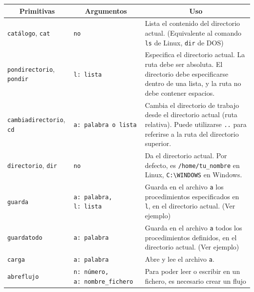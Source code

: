 \begin{center} \begin{longtable}{|m{3cm}|m{32mm}|m{9cm}|} \hline 
   \multicolumn{1}{|c|}{\textbf{Primitivas}} &
      \multicolumn{1}{c|}{\textbf{Argumentos}} &
         \multicolumn{1}{c|}{\textbf{Uso}} \\ \endhead \hline 
   \texttt{cat\'alogo}, \index{cat\'alogo@\texttt{cat\'alogo}}
     \texttt{cat} \index{cat@\texttt{cat}} & \texttt{no} &
        Lista el contenido del directorio actual. (Equivalente al comando
        \texttt{ls} de Linux, \texttt{dir} de DOS) \\ \hline 
   \texttt{pondirectorio}, \index{pondirectorio@\texttt{pondirectorio}}
     \texttt{pondir} \index{pondir@\texttt{pondir}} & \texttt{l: lista} &
        Especifica el directorio actual. La ruta debe ser absoluta. El
        directorio debe especificarse dentro de una lista, y la ruta no
        debe contener espacios. \\ \hline 
   \texttt{cambiadirectorio},
     \index{cambiadirectorio@\texttt{cambiadirectorio}}
     \texttt{cd} \index{cd@\texttt{cd}} & \texttt{a: palabra o lista} &
        Cambia el directorio de trabajo desde el directorio actual (ruta
        relativa). Puede utilizarse \texttt{..} para referirse a la
        ruta del directorio superior. \\ \hline 
   \texttt{directorio}, \index{directorio@\texttt{directorio}}
      \texttt{dir} \index{dir@\texttt{dir}} & \texttt{no} &
        Da el directorio actual. Por defecto, es \texttt{/home/tu\_nombre}
        en Linux, \texttt{C:\textbackslash{}WINDOWS} en Windows. \\ \hline 
   \texttt{guarda} \index{guarda@\texttt{guarda}} & 
      \texttt{a:~palabra, l:~lista} & 
        Guarda en el archivo \texttt{a} los procedimientos especificados en
        \texttt{l}, en el directorio actual. (Ver ejemplo) \\ \hline 
   \texttt{guardatodo} \index{guardatodo@\texttt{guardatodo}} & 
      \texttt{a: palabra} &
        Guarda en el archivo \texttt{a} todos los procedimientos definidos,
        en el directorio actual. (Ver ejemplo)\\ \hline 
   \texttt{carga} \index{carga@\texttt{carga}} & \texttt{a: palabra} &
        Abre y lee el archivo \texttt{a}. \\ \hline 
   \texttt{abreflujo} \index{abreflujo@\texttt{abreflujo}} &
     \texttt{n:~{}n\'umero, a:~{}nombre\_fichero} & 
        Para poder leer o escribir en un fichero, es necesario crear un flujo

\end{longtable}
\end{center}

